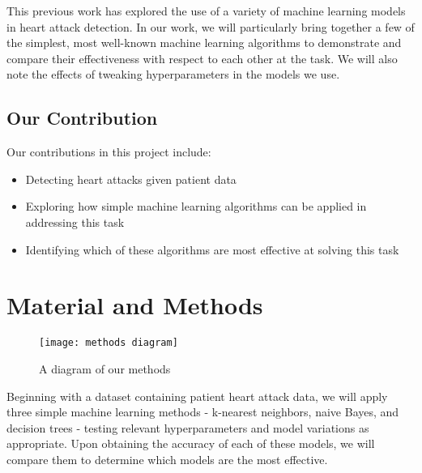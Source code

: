 \documentclass{article}
\begin{document}
This previous work has explored the use of a variety of machine learning models in heart attack detection. In our work, we will particularly bring together a few of the simplest, most well-known machine learning algorithms to demonstrate and compare their effectiveness with respect to each other at the task. We will also note the effects of tweaking hyperparameters in the models we use.

\subsection{Our Contribution}
Our contributions in this project include:
\begin{itemize}
\item Detecting heart attacks given patient data
\item Exploring how simple machine learning algorithms can be applied in addressing this task
\item Identifying which of these algorithms are most effective at solving this task
\end{itemize} 
\section{Material and Methods}
\begin{figure}[h]
\texttt{[image: methods diagram]}
\centering
\caption{A diagram of our methods}
\centering
\end{figure}
Beginning with a dataset containing patient heart attack data, we will apply three simple machine learning methods - k-nearest neighbors, naive Bayes, and decision trees - testing relevant hyperparameters and model variations as appropriate. Upon obtaining the accuracy of each of these models, we will compare them to determine which models are the most effective. 
\end{document}
